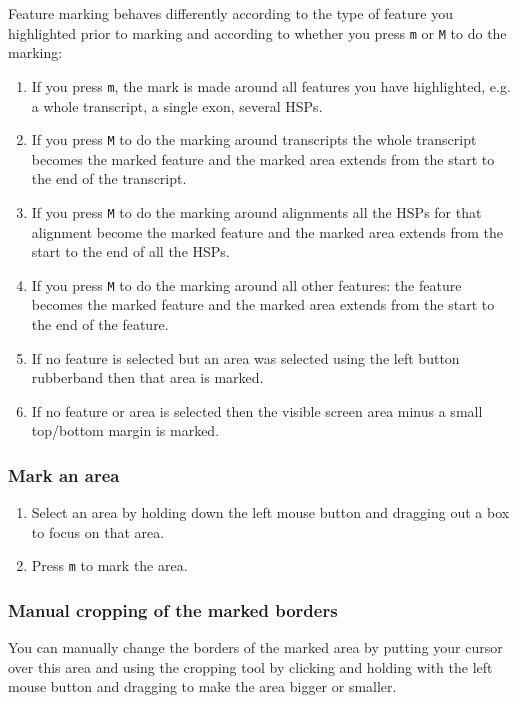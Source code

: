 \documentclass[letterpaper]{article}
\begin{document}
Feature marking behaves differently according to the type of feature you highlighted prior to marking and according to whether you press \lstinline{m} or \lstinline{M} to do the marking:

\begin{enumerate}
\item  If you press \lstinline{m}, the mark is made around all features you have highlighted, e.g. a whole transcript, a single exon, several HSPs.
\item  If you press \lstinline{M} to do the marking around transcripts the whole transcript becomes the marked feature and the marked area extends from the start to the end of the transcript.
\item  If you press \lstinline{M} to do the marking around alignments all the HSPs for that alignment become the marked feature and the marked area extends from the start to the end of all the HSPs.
\item  If you press \lstinline{M} to do the marking around all other features: the feature becomes the marked feature and the marked area extends from the start to the end of the feature.
\item  If no feature is selected but an area was selected using the left button rubberband then that area is marked.
\item  If no feature or area is selected then the visible screen area minus a small top/bottom margin is marked.
\end{enumerate}

\subsubsection{Mark an area}
\begin{enumerate}
\item Select an area by holding down the left mouse button and dragging out a box to focus on that area.
\item Press \lstinline{m} to mark the area.
\end{enumerate}

\subsubsection{Manual cropping of the marked borders}
You can manually change the borders of the marked area by putting your cursor over this area and using the cropping tool by clicking and holding with the left mouse button and dragging to make the area bigger or smaller.
\end{document}
